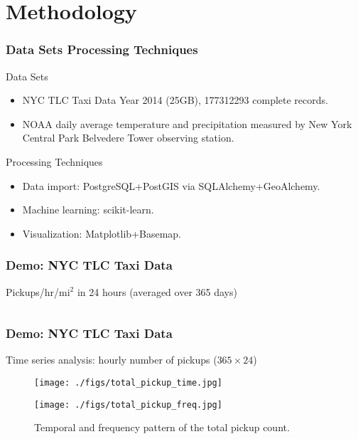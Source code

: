 \documentclass{beamer}
\begin{document}
\section[Methodology]{Methodology}
\begin{frame}
  \frametitle{Data Sets Processing Techniques}
  \begin{block}{Data Sets}
    \begin{itemize}
      \item NYC TLC Taxi Data Year 2014 (25GB), 177312293 complete records.
      \item NOAA daily average temperature and precipitation measured by New
      York Central Park Belvedere Tower observing station.
    \end{itemize}
  \end{block}
 \begin{block}{Processing Techniques}
    \begin{itemize}
      \item Data import: PostgreSQL+PostGIS via SQLAlchemy+GeoAlchemy.
      \item Machine learning: scikit-learn.
      \item Visualization: Matplotlib+Basemap.
    \end{itemize}
  \end{block}
\end{frame}

\begin{frame}
  \frametitle{Demo: NYC TLC Taxi Data}
  Pickups/hr/mi$^2$ in 24 hours (averaged over 365 days)
  \begin{columns}[c]

  \end{columns}
\end{frame}

\begin{frame}
  \frametitle{Demo: NYC TLC Taxi Data}
  Time series analysis: hourly number of pickups ($365\times 24$)
  \begin{figure}
    \centering
    \begin{minipage}[b]{1.0\columnwidth}
      \centering
      \centerline{\texttt{[image: ./figs/total\_pickup\_time.jpg]}}
    \end{minipage}
    \hfill
    \begin{minipage}[b]{1.0\columnwidth}
      \centering
      \centerline{\texttt{[image: ./figs/total\_pickup\_freq.jpg]}}
    \end{minipage}
    \caption{Temporal and frequency pattern of the total pickup count.}
    \label{fig:temporal_freq}
  \end{figure}
\end{frame}
\end{document}
